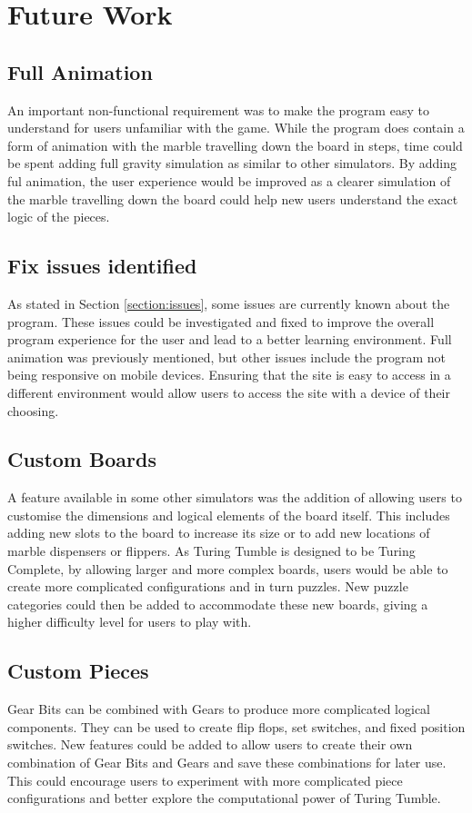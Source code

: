 \documentclass{l4proj}
\begin{document}
\section{Future Work}
\label{section:future-work}
\subsection{Full Animation}
An important non-functional requirement was to make the program easy to understand for users unfamiliar with the game. While the program does contain a form of animation with the marble travelling down the board in steps, time could be spent adding full gravity simulation as similar to other simulators. By adding ful animation, the user experience would be improved as a clearer simulation of the marble travelling down the board could help new users understand the exact logic of the pieces.

\subsection{Fix issues identified}
As stated in Section \ref{section:issues}, some issues are currently known about the program. These issues could be investigated and fixed to improve the overall program experience for the user and lead to a better learning environment. Full animation was previously mentioned, but other issues include the program not being responsive on mobile devices. Ensuring that the site is easy to access in a different environment would allow users to access the site with a device of their choosing.

\subsection{Custom Boards}
A feature available in some other simulators was the addition of allowing users to customise the dimensions and logical elements of the board itself. This includes adding new slots to the board to increase its size or to add new locations of marble dispensers or flippers. As Turing Tumble is designed to be Turing Complete, by allowing larger and more complex boards, users would be able to create more complicated configurations and in turn puzzles. New puzzle categories could then be added to accommodate these new boards, giving a higher difficulty level for users to play with.  

\subsection{Custom Pieces}
Gear Bits can be combined with Gears to produce more complicated logical components. They can be used to create flip flops, set switches, and fixed position switches. New features could be added to allow users to create their own combination of Gear Bits and Gears and save these combinations for later use. This could encourage users to experiment with more complicated piece configurations and better explore the computational power of Turing Tumble.
\end{document}
